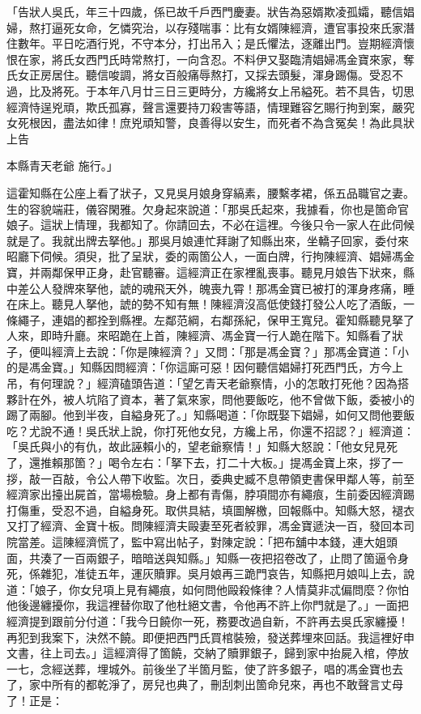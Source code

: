 \begin{showcontents}{}
「告狀人吳氏，年三十四歲，係已故千戶西門慶妻。狀告為惡婿欺凌孤孀，聽信娼婦，熬打逼死女命，乞憐究治，以存殘喘事：比有女婿陳經濟，遭官事投來氏家潛住數年。平日吃酒行兇，不守本分，打出吊入；是氏懼法，逐離出門。豈期經濟懷恨在家，將氏女西門氏時常熬打，一向含忍。不料伊又娶臨清娼婦馮金寶來家，奪氏女正房居住。聽信唆調，將女百般痛辱熬打，又採去頭髮，渾身踢傷。受忍不過，比及將死。于本年八月廿三日三更時分，方纔將女上吊縊死。若不具告，切思經濟恃逞兇頑，欺氏孤寡，聲言還要持刀殺害等語，情理難容乞賜行拘到案，嚴究女死根因，盡法如律！庶兇頑知警，良善得以安生，而死者不為含冤矣！為此具狀上告

本縣青天老爺    施行。」

這霍知縣在公座上看了狀子，又見吳月娘身穿縞素，腰繫孝裙，係五品職官之妻。生的容貌端莊，儀容閑雅。欠身起來說道：「那吳氏起來，我據看，你也是箇命官娘子。這狀上情理，我都知了。你請回去，不必在這裡。今後只令一家人在此伺候就是了。我就出牌去拏他。」那吳月娘連忙拜謝了知縣出來，坐轎子回家，委付來昭廳下伺候。須臾，批了呈狀，委的兩箇公人，一面白牌，行拘陳經濟、娼婦馮金寶，并兩鄰保甲正身，赴官聽審。這經濟正在家裡亂喪事。聽見月娘告下狀來，縣中差公人發牌來拏他，諕的魂飛天外，魄喪九霄！那馮金寶已被打的渾身疼痛，睡在床上。聽見人拏他，諕的勢不知有無！陳經濟沒高低使錢打發公人吃了酒飯，一條繩子，連娼的都拴到縣裡。左鄰范綱，右鄰孫紀，保甲王寬兒。霍知縣聽見拏了人來，即時升廳。來昭跪在上首，陳經濟、馮金寶一行人跪在階下。知縣看了狀子，便叫經濟上去說：「你是陳經濟？」又問：「那是馮金寶？」那馮金寶道：「小的是馮金寶。」知縣因問經濟：「你這廝可惡！因何聽信娼婦打死西門氏，方今上吊，有何理說？」經濟磕頭告道：「望乞青天老爺察情，小的怎敢打死他？因為搭夥計在外，被人坑陷了資本，著了氣來家，問他要飯吃，他不曾做下飯，委被小的踢了兩腳。他到半夜，自縊身死了。」知縣喝道：「你既娶下娼婦，如何又問他要飯吃？尤說不通！吳氏狀上說，你打死他女兒，方纔上吊，你還不招認？」經濟道：「吳氏與小的有仇，故此誣賴小的，望老爺察情！」知縣大怒說：「他女兒見死了，還推賴那箇？」喝令左右：「拏下去，打二十大板。」提馮金寶上來，拶了一拶，敲一百敲，令公人帶下收監。次日，委典史臧不息帶領吏書保甲鄰人等，前至經濟家出擡出屍首，當場檢驗。身上都有青傷，脖項間亦有繩痕，生前委因經濟踢打傷重，受忍不過，自縊身死。取供具結，填圖解檄，回報縣中。知縣大怒，褪衣又打了經濟、金寶十板。問陳經濟夫毆妻至死者絞罪，馮金寶遞決一百，發回本司院當差。這陳經濟慌了，監中寫出帖子，對陳定說：「把布舖中本錢，連大姐頭面，共湊了一百兩銀子，暗暗送與知縣。」知縣一夜把招卷改了，止問了箇逼令身死，係雜犯，准徒五年，運灰贖罪。吳月娘再三跪門哀告，知縣把月娘叫上去，說道：「娘子，你女兒項上見有繩痕，如何問他毆殺條律？人情莫非忒偏問麼？你怕他後邊纏擾你，我這裡替你取了他杜絕文書，令他再不許上你門就是了。」一面把經濟提到跟前分付道：「我今日饒你一死，務要改過自新，不許再去吳氏家纏擾！再犯到我案下，決然不饒。即便把西門氏買棺裝殮，發送葬埋來回話。我這裡好申文書，往上司去。」這經濟得了箇饒，交納了贖罪銀子，歸到家中抬屍入棺，停放一七，念經送葬，埋城外。前後坐了半箇月監，使了許多銀子，唱的馮金寶也去了，家中所有的都乾淨了，房兒也典了，刪刮刺出箇命兒來，再也不敢聲言丈母了！正是：


\end{showcontents}
